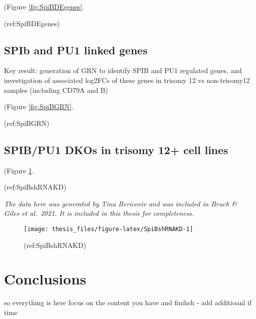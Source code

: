 \documentclass[11pt, a4paper, twosided]{book}
\begin{document}
(Figure \ref{fig:SpiBDEgenes}.

(ref:SpiBDEgenes)

\hypertarget{spib-and-pu1-linked-genes}{%
\subsection{SPIb and PU1 linked genes}\label{spib-and-pu1-linked-genes}}

Key result: generation of GRN to identify SPIB and PU1 regulated genes, and investigation of associated log2FCs of these genes in trisomy 12 vs non-trisomy12 samples (including CD79A and B)

(Figure \ref{fig:SpiBGRN}.

(ref:SpiBGRN)

\hypertarget{spibpu1-dkos-in-trisomy-12-cell-lines}{%
\subsection{SPIB/PU1 DKOs in trisomy 12+ cell lines}\label{spibpu1-dkos-in-trisomy-12-cell-lines}}

(Figure \ref{fig:SpiBshRNAKD}.

(ref:SpiBshRNAKD)

\emph{The data here was generated by Tina Bericoviv and was included in Bruch \& Giles et al.~2021. It is included in this thesis for completeness.}
\begin{figure}

{\centering \texttt{[image: thesis\_files/figure-latex/SpiBshRNAKD-1]} 

}

\caption{(ref:SpiBshRNAKD)}\label{fig:SpiBshRNAKD}
\end{figure}
\hypertarget{conclusions}{%
\section{Conclusions}\label{conclusions}}

so everything is here
focus on the content you have and finihsh - add additioanl if time
\end{document}
